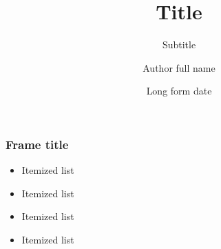 \documentclass[12pt]{beamer}
\title{Title}
\subtitle{Subtitle}
\author[Author]{Author full name}
\institute[Inst]{Institute full name}
\date[Date]{Long form date}
\begin{document}
\begin{frame}[plain]
  \titlepage
\end{frame}

\begin{frame}
  \frametitle{Frame title}
  \begin{itemize}
    \item Itemized list
    \item Itemized list
    \item Itemized list
    \item Itemized list
  \end{itemize}
\end{frame}
\end{document}
